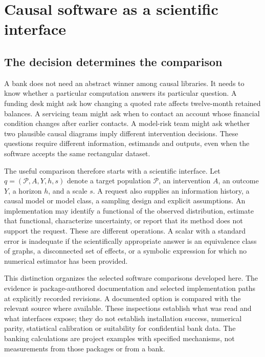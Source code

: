 \chapter{Causal software as a scientific interface}
\label{sw:interfaces}

\section{The decision determines the comparison}

A bank does not need an abstract winner among causal libraries. It needs to
know whether a particular computation answers its particular question. A
funding desk might ask how changing a quoted rate affects twelve-month retained
balances. A servicing team might ask when to contact an account whose financial
condition changes after earlier contacts. A model-risk team might ask whether
two plausible causal diagrams imply different intervention decisions. These
questions require different information, estimands and outputs, even when the
software accepts the same rectangular dataset.

The useful comparison therefore starts with a scientific interface. Let
\(q=(\mathcal P,A,Y,h,s)\) denote a target population \(\mathcal P\), an intervention
\(A\), an outcome \(Y\), a horizon \(h\), and a scale \(s\). A request also supplies
an information history, a causal model or model class, a sampling design and
explicit assumptions. An implementation may identify a functional of the
observed distribution, estimate that functional, characterize uncertainty, or
report that its method does not support the request. These are different
operations. A scalar with a standard error is inadequate if the scientifically
appropriate answer is an equivalence class of graphs, a disconnected set of
effects, or a symbolic expression for which no numerical estimator has been
provided.

This distinction organizes the selected software comparisons developed here.
The evidence is package-authored documentation and selected implementation
paths at explicitly recorded revisions. A documented option is compared with
the relevant source where available. These inspections establish what was
read and what interfaces expose; they do not establish installation success,
numerical parity, statistical calibration or suitability for confidential bank
data. The banking calculations are project examples with specified mechanisms,
not measurements from those packages or from a bank.

